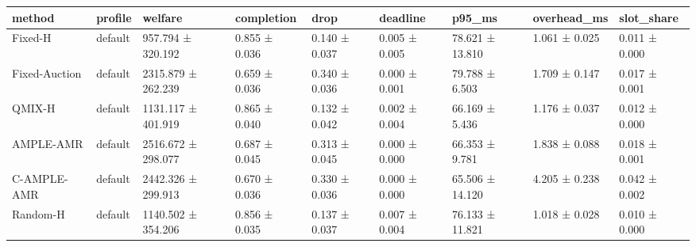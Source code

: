 \begin{tabular}{lllllllll}
\toprule
method & profile & welfare & completion & drop & deadline & p95\_ms & overhead\_ms & slot\_share \\
\midrule
Fixed-H & default & 957.794 ± 320.192 & 0.855 ± 0.036 & 0.140 ± 0.037 & 0.005 ± 0.005 & 78.621 ± 13.810 & 1.061 ± 0.025 & 0.011 ± 0.000 \\
Fixed-Auction & default & 2315.879 ± 262.239 & 0.659 ± 0.036 & 0.340 ± 0.036 & 0.000 ± 0.001 & 79.788 ± 6.503 & 1.709 ± 0.147 & 0.017 ± 0.001 \\
QMIX-H & default & 1131.117 ± 401.919 & 0.865 ± 0.040 & 0.132 ± 0.042 & 0.002 ± 0.004 & 66.169 ± 5.436 & 1.176 ± 0.037 & 0.012 ± 0.000 \\
AMPLE-AMR & default & 2516.672 ± 298.077 & 0.687 ± 0.045 & 0.313 ± 0.045 & 0.000 ± 0.000 & 66.353 ± 9.781 & 1.838 ± 0.088 & 0.018 ± 0.001 \\
C-AMPLE-AMR & default & 2442.326 ± 299.913 & 0.670 ± 0.036 & 0.330 ± 0.036 & 0.000 ± 0.000 & 65.506 ± 14.120 & 4.205 ± 0.238 & 0.042 ± 0.002 \\
Random-H & default & 1140.502 ± 354.206 & 0.856 ± 0.035 & 0.137 ± 0.037 & 0.007 ± 0.004 & 76.133 ± 11.821 & 1.018 ± 0.028 & 0.010 ± 0.000 \\
\bottomrule
\end{tabular}
